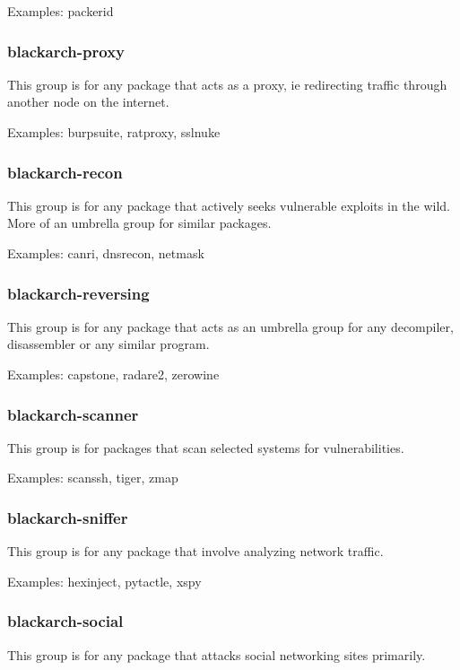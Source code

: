 \documentclass[a4paper, oneside, 11pt]{book}
\begin{document}
Examples: packerid

\subsubsection{blackarch-proxy}

This group is for any package that acts as a proxy, ie redirecting traffic through another node on the internet.

Examples: burpsuite, ratproxy, sslnuke

\subsubsection{blackarch-recon}

This group is for any package that actively seeks vulnerable exploits in the wild. More of an umbrella group for similar packages.

Examples: canri, dnsrecon, netmask

\subsubsection{blackarch-reversing}

This group is for any package that acts as an umbrella group for any decompiler, disassembler or any similar program.

Examples: capstone, radare2, zerowine

\subsubsection{blackarch-scanner}

This group is for packages that scan selected systems for vulnerabilities.

Examples: scanssh, tiger, zmap

\subsubsection{blackarch-sniffer}

This group is for any package that involve analyzing network traffic.

Examples: hexinject, pytactle, xspy

\subsubsection{blackarch-social}

This group is for any package that attacks social networking sites primarily.
\end{document}
